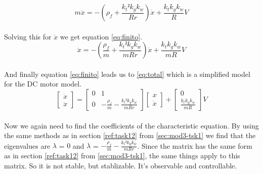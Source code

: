 \documentclass[final]{scrreprt} %
\begin{document}
\begin{enumerate}
\begin{equation}
m\ddot{x} = -( \rho_f + \frac{k_t² k_g k_w}{Rr}) \dot{x} + \frac{k_t k_g k_w}{R}V
\label{eq:motiontau}
\end{equation}
\\
Solving this for $\ddot{x}$ we get equation \ref{eq:finito}.
\\
\begin{equation}
\ddot{x} = -( \frac{\rho_f}{m} + \frac{k_t² k_g k_w}{mRr}) \dot{x} + \frac{k_t k_g k_w}{mR}V
\label{eq:finito}
\end{equation}\\

And finally equation \ref{eq:finito} leads us to \ref{eq:total} which is a simplified model for the DC motor model. 
\begin{equation}
	\begin{bmatrix}
		\dot{x} \\
		\ddot{x}
	\end{bmatrix} =
	\begin{bmatrix}
		0 & 1 \\
		0 & -\frac{\rho_f}{m} - \frac{k_t² k_g k_w}{mRr}
	\end{bmatrix}
	\begin{bmatrix}
		x \\
		\dot{x}
	\end{bmatrix} +
	\begin{bmatrix}
		0 \\
		\frac{k_t k_g k_w}{mR}
	\end{bmatrix}
	V
	\label{eq:total}
\end{equation}
\\
Now we again need to find the coefficients of the characteristic equation. By using the same methods as in section \ref{ref:task12} from \ref{sec:mod3-tsk1} we find that the eigenvalues are $\lambda$ = $0$ and $\lambda$ = $ -\frac{\rho_f}{m} - \frac{k_t² k_g k_w}{mRr}$. Since the matrix has the same form as in section \ref{ref:task12} from \ref{sec:mod3-tsk1}, the same things apply to this matrix. 
So it is not stable, but stablizable. It's observable and controllable.


\end{enumerate}
\end{document}
